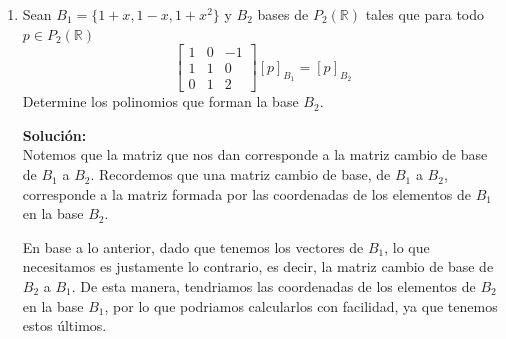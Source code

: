 \documentclass[12pt]{article}
\newenvironment{solucion}
{\begin{mdframed}[backgroundcolor=black!10]
		{\bf Solución:}\\
	}
	{
	\end{mdframed}
}
\newenvironment{preguntas}
{\begin{enumerate}\itemsep12pt
	}
	{
	\end{enumerate}
}
\newcommand{\R}{\mathbb{R}}
\newcommand{\widesim}[2][1.5]{
	\mathrel{\overset{#2}{\scalebox{#1}[1]{$\sim$}}}
}
\newcommand{\wsim}{\widesim{}}
\begin{document}
\begin{preguntas}
\begin{solucion}
$$\begin{pmatrix}
\end{pmatrix}$$
Por lo tanto,
$$T(t^2+1) = 2-t-3t^2$$
Para determinar el espacio Nulo de $T$, debemos calcular el espacio Nulo de $[T]_B$ y a partir de eso obtener el espacio Nulo de $T$.
$$\begin{bmatrix}
1 & -1 & 1\\
0 & 2 & -1\\
-1 & 3 & -2
\end{bmatrix} \wsim
\begin{bmatrix}
1 & -1 & 1\\
0 & 2 & -1\\
0 & 0 & 0
\end{bmatrix}$$
De aqui tenemos que
$$Nul([T]_B) = Gen\left\{\begin{pmatrix}
-1 \\ 1 \\2
\end{pmatrix}\right\}$$
Finalmente,
$$Nul(T) = Gen\{-1+t+2t^2\}$$
\end{solucion}
\item Sean $B_1 = \{1+x,1-x,1+x^2\}$ y $B_2$ bases de $P_2(\R)$ tales que para todo $p \in P_2(\R)$
	$$ \begin{bmatrix}
	1 & 0 & -1\\
	1 & 1 & 0 \\
	0 & 1 & 2
	\end{bmatrix} [p]_{B_1} = [p]_{B_2}$$
	Determine los polinomios que forman la base $B_2$.
\begin{solucion}
Notemos que la matriz que nos dan corresponde a la matriz cambio de base de $B_1$ a $B_2$. Recordemos que una matriz cambio de base, de $B_1$ a $B_2$, corresponde a la matriz formada por las coordenadas de los elementos de $B_1$ en la base $B_2$.
		
		En base a lo anterior, dado que tenemos los vectores de $B_1$, lo que necesitamos es justamente lo contrario, es decir, la matriz cambio de base de $B_2$ a $B_1$. De esta manera, tendriamos las coordenadas de los elementos de $B_2$ en la base $B_1$, por lo que podriamos calcularlos con facilidad, ya que tenemos estos últimos.
		

\end{solucion}
\end{preguntas}
\end{document}
